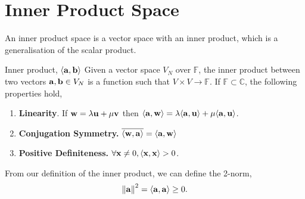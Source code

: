 \documentclass{book}
\def\innerproduct#1#2{\langle#1,#2\rangle}
\begin{document}
\chapter{Inner Product Space}
An inner product space is a vector space with an inner product, which is a generalisation of the scalar product.
\begin{Definitions}{Inner product, $\innerproduct{\vb{a}}{\vb{b}}$}{}
	Given a vector space $V_N$ over $\mathbb{F}$, the inner product between two vectors $\vb{a},\vb{b} \in V_N$ is a function such that $V \times V \to \mathbb{F}$. If $\mathbb{F} \subset \mathbb{C}$, the following properties hold,
	\begin{enumerate}
		\item \textbf{Linearity}. If $\vb{w} = \lambda\vb{u} + \mu\vb{v}$ then $\innerproduct{\vb{a}}{\vb{w}} = \lambda\innerproduct{\vb{a}}{\vb{u}} + \mu \innerproduct{\vb{a}}{\vb{u}}$.
		\item \textbf{Conjugation Symmetry.} $\overline{\innerproduct{\vb{w}}{\vb{a}}} = \innerproduct{\vb{a}}{\vb{w}}$
		\item \textbf{Positive Definiteness.} $\forall \vb{x}\neq0, \innerproduct{\vb{x}}{\vb{x}} > 0$.
	\end{enumerate}
\end{Definitions}
From our definition of the inner product, we can define the 2-norm,
\begin{equation}
	\norm{\vb{a}}^2 = \innerproduct{\vb{a}}{\vb{a}} \geq 0.
\end{equation}
\end{document}
